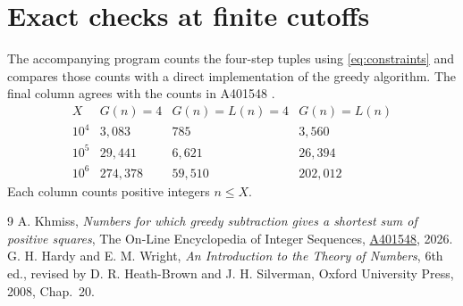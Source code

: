 \documentclass[11pt]{article}
\begin{document}
\section{Exact checks at finite cutoffs}

The accompanying program counts the four-step tuples using \eqref{eq:constraints} and compares those counts with a direct implementation of the greedy algorithm. The final column agrees with the counts in A401548 \cite{oeis}.
\[
\begin{array}{r|rrr}
X & G(n)=4 & G(n)=L(n)=4 & G(n)=L(n)\\ \hline
10^4 & 3{,}083 & 785 & 3{,}560\\
10^5 & 29{,}441 & 6{,}621 & 26{,}394\\
10^6 & 274{,}378 & 59{,}510 & 202{,}012
\end{array}
\]
Each column counts positive integers \(n\le X\).

\begin{thebibliography}{9}
A. Khmiss, \emph{Numbers for which greedy subtraction gives a shortest sum of positive squares}, The On-Line Encyclopedia of Integer Sequences,
\href{https://oeis.org/A401548}{A401548}, 2026.
G. H. Hardy and E. M. Wright, \emph{An Introduction to the Theory of Numbers}, 6th ed., revised by D. R. Heath-Brown and J. H. Silverman, Oxford University Press, 2008, Chap.~20.
\end{thebibliography}
\end{document}
